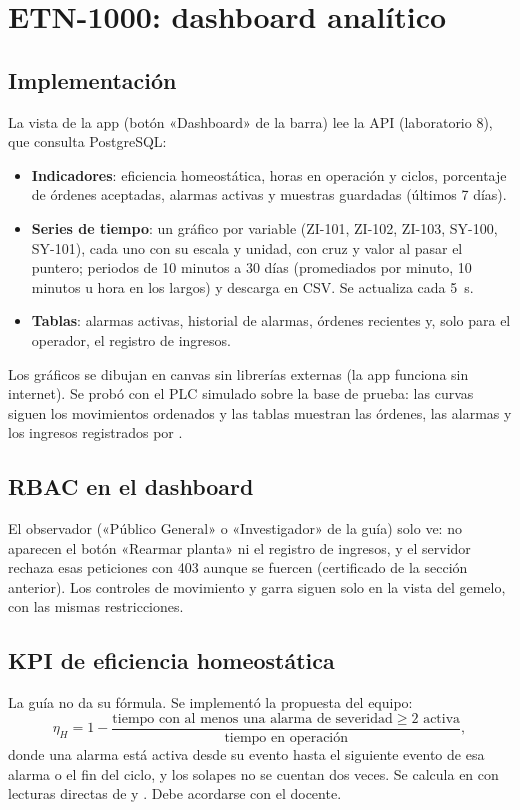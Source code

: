 \documentclass[a4paper,11pt]{article}
\begin{document}
\section{ETN-1000: dashboard analítico}
\subsection{Implementación}
La vista  de la app (botón «Dashboard» de la barra) lee la API  (laboratorio 8), que consulta PostgreSQL:
\begin{itemize}
\item \textbf{Indicadores}: eficiencia homeostática, horas en operación y ciclos, porcentaje de órdenes aceptadas, alarmas activas y muestras guardadas (últimos 7 días).
\item \textbf{Series de tiempo}: un gráfico por variable (ZI-101, ZI-102, ZI-103, SY-100, SY-101), cada uno con su escala y unidad, con cruz y valor al pasar el puntero; periodos de 10 minutos a 30 días (promediados por minuto, 10 minutos u hora en los largos) y descarga en CSV. Se actualiza cada 5~s.
\item \textbf{Tablas}: alarmas activas, historial de alarmas, órdenes recientes y, solo para el operador, el registro de ingresos.
\end{itemize}
Los gráficos se dibujan en canvas sin librerías externas (la app funciona sin internet). Se probó con el PLC simulado sobre la base de prueba: las curvas siguen los movimientos ordenados y las tablas muestran las órdenes, las alarmas y los ingresos registrados por .

\subsection{RBAC en el dashboard}
El observador («Público General» o «Investigador» de la guía) solo ve: no aparecen el botón «Rearmar planta» ni el registro de ingresos, y el servidor rechaza esas peticiones con 403 aunque se fuercen (certificado de la sección anterior). Los controles de movimiento y garra siguen solo en la vista del gemelo, con las mismas restricciones.

\subsection{KPI de eficiencia homeostática}
La guía no da su fórmula. Se implementó la propuesta del equipo:
\[
\eta_H = 1 - \frac{\text{tiempo con al menos una alarma de severidad} \ge 2 \text{ activa}}{\text{tiempo en operación}},
\]
donde una alarma está activa desde su evento  hasta el siguiente evento de esa alarma o el fin del ciclo, y los solapes no se cuentan dos veces. Se calcula en  con lecturas directas de  y . Debe acordarse con el docente.
\end{document}
